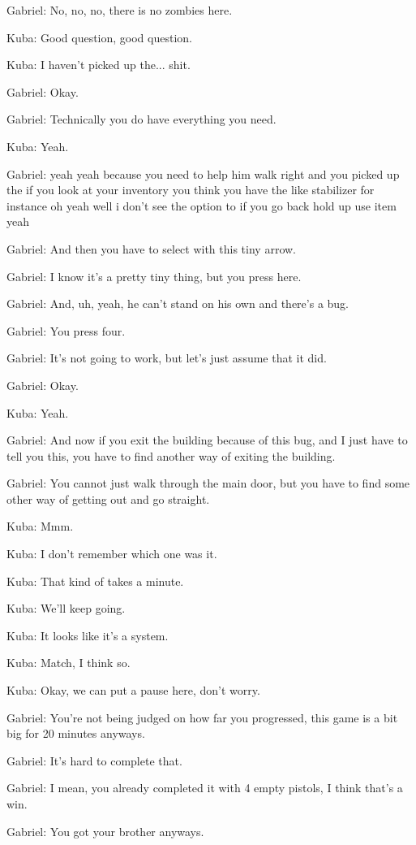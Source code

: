 Gabriel: No, no, no, there is no zombies here.

Kuba: Good question, good question.

Kuba: I haven't picked up the... shit.

Gabriel: Okay.

Gabriel: Technically you do have everything you need.

Kuba: Yeah.

Gabriel: yeah yeah because you need to help him walk right and you picked up the if you look at your inventory you think you have the like stabilizer for instance oh yeah well i don't see the option to if you go back hold up use item yeah

Gabriel: And then you have to select with this tiny arrow.

Gabriel: I know it's a pretty tiny thing, but you press here.

Gabriel: And, uh, yeah, he can't stand on his own and there's a bug.

Gabriel: You press four.

Gabriel: It's not going to work, but let's just assume that it did.

Gabriel: Okay.

Kuba: Yeah.

Gabriel: And now if you exit the building because of this bug, and I just have to tell you this, you have to find another way of exiting the building.

Gabriel: You cannot just walk through the main door, but you have to find some other way of getting out and go straight.

Kuba: Mmm.

Kuba: I don't remember which one was it.

Kuba: That kind of takes a minute.

Kuba: We'll keep going.

Kuba: It looks like it's a system.

Kuba: Match, I think so.

Kuba: Okay, we can put a pause here, don't worry.

Gabriel: You're not being judged on how far you progressed, this game is a bit big for 20 minutes anyways.

Gabriel: It's hard to complete that.

Gabriel: I mean, you already completed it with 4 empty pistols, I think that's a win.

Gabriel: You got your brother anyways.

